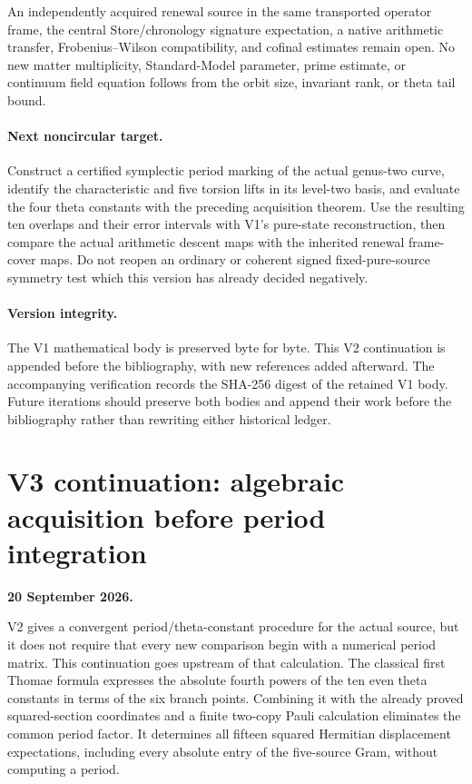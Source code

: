 \documentclass[11pt]{article}
\theoremstyle{definition}
\theoremstyle{remark}
\begin{document}
An independently acquired renewal source in the same transported operator
frame, the central Store/chronology signature expectation, a native
arithmetic transfer, Frobenius--Wilson compatibility, and cofinal estimates
remain open. No new matter multiplicity, Standard-Model parameter, prime
estimate, or continuum field equation follows from the orbit size, invariant
rank, or theta tail bound.

\paragraph{Next noncircular target.}
Construct a certified symplectic period marking of the actual genus-two
curve, identify the characteristic and five torsion lifts in its level-two
basis, and evaluate the four theta constants with the preceding acquisition
theorem. Use the resulting ten overlaps and their error intervals with V1's
pure-state reconstruction, then compare the actual arithmetic descent maps
with the inherited renewal frame-cover maps. Do not reopen an ordinary or
coherent signed fixed-pure-source symmetry test which this version has
already decided negatively.

\paragraph{Version integrity.}
The V1 mathematical body is preserved byte for byte. This V2 continuation is
appended before the bibliography, with new references added afterward. The
accompanying verification records the SHA-256 digest of the retained V1 body.
Future iterations should preserve both bodies and append their work before
the bibliography rather than rewriting either historical ledger.


\clearpage
\section{V3 continuation: algebraic acquisition before period integration}
\label{sec:v3-context}
\noindent\textbf{20 September 2026.}

V2 gives a convergent period/theta-constant procedure for the actual source,
but it does not require that every new comparison begin with a numerical
period matrix. This continuation goes upstream of that calculation. The
classical first Thomae formula expresses the absolute fourth powers of the
ten even theta constants in terms of the six branch points. Combining it
with the already proved squared-section coordinates and a finite two-copy
Pauli calculation eliminates the common period factor. It determines all
fifteen squared Hermitian displacement expectations, including every
absolute entry of the five-source Gram, without computing a period.
\end{document}
